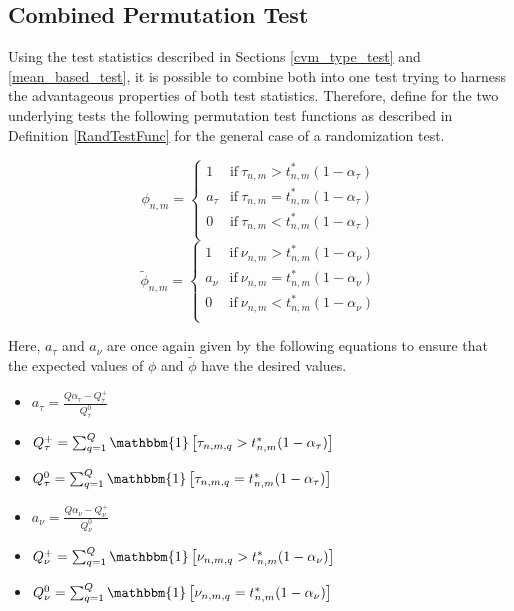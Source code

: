 \documentclass[12pt, a4paper]{article}
\theoremstyle{MAstyle} \newtheorem{assumption}{Assumption}[section]
\theoremstyle{MAstyle} \newtheorem{definition}{Definition}[section]
\theoremstyle{MAstyle} \newtheorem{theorem}{Theorem}[section]
\begin{document}
		\newpage
		\subsection{Combined Permutation Test}
			Using the test statistics described in Sections \ref{cvm_type_test} and \ref{mean_based_test}, it is possible to combine both into one test trying to harness the advantageous properties of both test statistics. Therefore, define for the two underlying tests the following permutation test functions as described in Definition \ref{RandTestFunc} for the general case of a randomization test.
			\begin{multicols}{2}
				\noindent
				\begin{equation*}
					\phi_{n,m} = \begin{cases}
						1 &\text{if} \ \tau_{n,m} > t^{*}_{n,m}(1-\alpha_{\tau}) \\
						a_{\tau} &\text{if} \ \tau_{n,m} = t^{*}_{n,m}(1-\alpha_{\tau}) \\
						0 &\text{if} \ \tau_{n,m} < t^{*}_{n,m}(1-\alpha_{\tau}) \\
					\end{cases}
				\end{equation*}
				\begin{equation}
					\tilde{\phi}_{n,m} = \begin{cases}
						1 &\text{if} \ \nu_{n,m} > t^{*}_{n,m}(1-\alpha_{\nu}) \\
						a_{\nu} &\text{if} \ \nu_{n,m} = t^{*}_{n,m}(1-\alpha_{\nu}) \\
						0 &\text{if} \ \nu_{n,m} < t^{*}_{n,m}(1-\alpha_{\nu}) \\
					\end{cases}
				\end{equation}
			\end{multicols}
			Here, $a_\tau$ and $a_\nu$ are once again given by the following equations to ensure that the expected values of $\phi$ and $\tilde{\phi}$ have the desired values.
			\begin{multicols}{2}
				\begin{itemize}
					\item $a_{\tau} = \frac{Q\alpha_{\tau} - Q_{\tau}^{+}}{Q_{\tau}^{0}}$ 
					\item $Q_{\tau}^{+} = \sum_{q = 1}^{Q}\mathbbm{1}\left[\tau_{n,m,q} > t^{*}_{n,m}(1-\alpha_{\tau})\right]$
					\item $Q_{\tau}^{0} = \sum_{q = 1}^{Q}\mathbbm{1}\left[\tau_{n,m,q} = t^{*}_{n,m}(1-\alpha_{\tau})\right]$
					\item $a_{\nu} = \frac{Q\alpha_{\nu} - Q_{\nu}^{+}}{Q_{\nu}^{0}}$ 
					\item $Q_{\nu}^{+} = \sum_{q = 1}^{Q}\mathbbm{1}\left[\nu_{n,m,q} > t^{*}_{n,m}(1-\alpha_{\nu})\right]$
					\item $Q_{\nu}^{0} = \sum_{q = 1}^{Q}\mathbbm{1}\left[\nu_{n,m,q} = t^{*}_{n,m}(1-\alpha_{\nu})\right]$
				\end{itemize} 
			\end{multicols}
\end{document}
